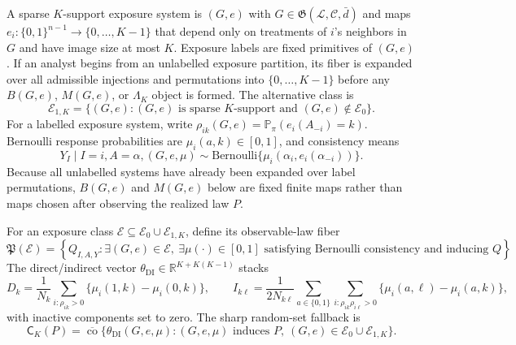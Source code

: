 \documentclass[11pt]{article}
\renewcommand{\Pr}{\mathbb{P}}
\theoremstyle{definition}
\theoremstyle{plain}
\theoremstyle{remark}
\begin{document}
A sparse \(K\)-support exposure system is \((G,e)\) with \(G\in\mathfrak G(\mathcal L,\mathcal C,\bar d)\) and maps \(e_i:\{0,1\}^{n-1}\to\{0,\ldots,K-1\}\) that depend only on treatments of \(i\)'s neighbors in \(G\) and have image size at most \(K\).  Exposure labels are fixed primitives of \((G,e)\).  If an analyst begins from an unlabelled exposure partition, its fiber is expanded over all admissible injections and permutations into \(\{0,\ldots,K-1\}\) before any \(B(G,e)\), \(M(G,e)\), or \(\Lambda_K\) object is formed.  The alternative class is
\[
\mathcal E_{1,K}=\{(G,e): (G,e)\text{ is sparse }K\text{-support and }(G,e)\notin\mathcal E_0\}.
\]
For a labelled exposure system, write \(\rho_{ik}(G,e)=\Pr_\pi(e_i(A_{-i})=k)\).  Bernoulli response probabilities are \(\mu_i(a,k)\in[0,1]\), and consistency means
\[
Y_I\mid I=i,A=\alpha,(G,e,\mu)\sim
\mathrm{Bernoulli}\{\mu_i(\alpha_i,e_i(\alpha_{-i}))\}.
\]
Because all unlabelled systems have already been expanded over label permutations, \(B(G,e)\) and \(M(G,e)\) below are fixed finite maps rather than maps chosen after observing the realized law \(P\).

For an exposure class \(\mathcal E\subseteq \mathcal E_0\cup\mathcal E_{1,K}\), define its observable-law fiber
\[
\mathfrak P(\mathcal E)=
\left\{
Q_{I,A,Y}: \exists (G,e)\in\mathcal E,\ \exists \mu(\cdot)\in[0,1]\text{ satisfying Bernoulli consistency and inducing }Q
\right\}.
\]
The direct/indirect vector \(\theta_{\mathrm{DI}}\in\mathbb R^{K+K(K-1)}\) stacks
\[
D_k=\frac{1}{N_k}\sum_{i:\rho_{ik}>0}\{\mu_i(1,k)-\mu_i(0,k)\},\qquad
I_{k\ell}=\frac{1}{2N_{k\ell}}\sum_{a\in\{0,1\}}\sum_{i:\rho_{ik}\rho_{i\ell}>0}\{\mu_i(a,\ell)-\mu_i(a,k)\},
\]
with inactive components set to zero.  The sharp random-set fallback is
\[
\mathsf C_K(P)=\overline{\operatorname{co}}\{\theta_{\mathrm{DI}}(G,e,\mu):(G,e,\mu)\text{ induces }P,\ (G,e)\in\mathcal E_0\cup\mathcal E_{1,K}\}.
\]
\end{document}

